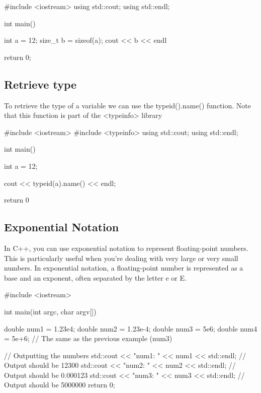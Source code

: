 \documentclass{report}
\begin{document}
    \begin{cppcode}
#include <iostream>
using std::cout;
using std::endl;

int main() {
    int a = 12;
    size_t b = sizeof(a);
    cout << b << endl

    return 0;
}
    \end{cppcode}
    
    \bigbreak \noindent 

    \bigbreak \noindent \bigbreak \noindent 
    \subsection{Retrieve type}
    \bigbreak \noindent 
    To retrieve the type of a variable we can use the typeid().name() function. Note that this function is part of the <typeinfo> library
    \bigbreak \noindent 
    
    \begin{cppcode}
#include <iostream>
#include <typeinfo>
using std::cout;
using std::endl;

int main(){

    int a = 12;

    cout << typeid(a).name() << endl;

    return 0
}
    \end{cppcode}
    
    \pagebreak
    \subsection{Exponential Notation}
    \bigbreak \noindent 
    In C++, you can use exponential notation to represent floating-point numbers. This is particularly useful when you're dealing with very large or very small numbers. In exponential notation, a floating-point number is represented as a base and an exponent, often separated by the letter e or E.
    \bigbreak \noindent 
    
    \begin{cppcode}
#include <iostream>

int main(int argc, char argv[]){
    double num1 = 1.23e4;
    double num2 = 1.23e-4;
    double num3 = 5e6;
    double num4 = 5e+6; // The same as the previous example (num3)

    // Outputting the numbers
    std::cout << "num1: " << num1 << std::endl;  // Output should be 12300
    std::cout << "num2: " << num2 << std::endl;  // Output should be 0.000123
    std::cout << "num3: " << num3 << std::endl;  // Output should be 5000000
    return 0;
}
    \end{cppcode}
    
\end{document}
